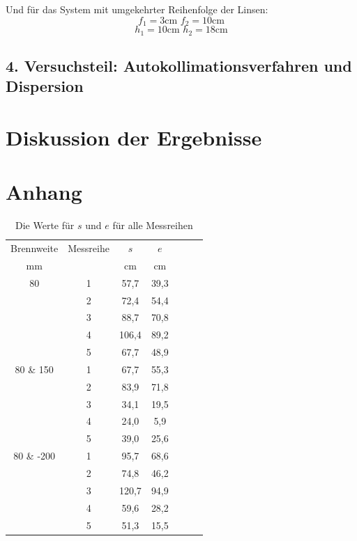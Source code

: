 \documentclass[11pt,a4paper]{article}
\begin{document}
Und für das System mit umgekehrter Reihenfolge der Linsen:
$$f_1 = 3\textrm{cm    } f_2 = 10 \textrm{cm}$$
$$ h_1 = 10\textrm{cm    } h_2 = 18 \textrm{cm}$$


\subsection{4. Versuchsteil: Autokollimationsverfahren und Dispersion}
\section{Diskussion der Ergebnisse}

\section{Anhang}


\begin{table}[h]
	\centering
	\begin{tabular*}{0.50\textwidth}{@{\extracolsep{\fill}}cc|ccccc}
		\toprule
		Brennweite & Messreihe & $s$ & $e$   \\
		mm &  & cm & cm  \\
		\bottomrule
		80 & 1 & 57,7 & 39,3 \\
		& 2 & 72,4 & 54,4 \\
		& 3 & 88,7 & 70,8 \\
		& 4 & 106,4 & 89,2 \\
		& 5 & 67,7 & 48,9 \\
		80 \& 150 & 1 & 67,7 & 55,3 \\
		& 2 & 83,9 & 71,8 \\
		& 3 & 34,1 & 19,5 \\
		& 4 & 24,0 & 5,9 \\
		& 5 & 39,0 & 25,6 \\
		80 \& -200 & 1 & 95,7 & 68,6 \\
		& 2 & 74,8 & 46,2 \\
		& 3 & 120,7 & 94,9 \\
		& 4 & 59,6 & 28,2 \\
		& 5 & 51,3 & 15,5 \\
		\bottomrule
	\end{tabular*}
	\caption{Die Werte für $s$ und $e$ für alle Messreihen}
\end{table}
\end{document}

